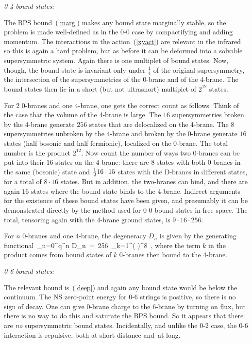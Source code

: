 {\it 0-4 bound states:} 

The BPS bound~(\ref{marg}) makes any bound state
marginally stable, so the problem is made well-defined as in the 0-0 case by
compactifying and adding momentum.\cite{senbound2}  The interactions in the
action~(\ref{xyact}) are relevant in the infrared so this is again a hard
problem, but as before it can be deformed into a solvable supersymmetric
system.  Again there is one multiplet of bound states.\cite{senbound2}
Now, though, the bound state is invariant only under $\frac{1}{4}$ of the
original supersymmetry, the intersection of the supersymmetries of the
0-brane and of the 4-brane.  The bound states then lie in a short (but not
ultrashort) multiplet of $2^{12}$ states.

For $2$ 0-branes and one 4-brane, one gets the correct count as
follows.\cite{vafa1} Think of the case that the volume of the 4-brane is
large.  The $16$ supersymmetries broken by the 4-brane generate $256$ states
that are  delocalized on the 4-brane.  The 8 supersymmetries unbroken by the
4-brane  and broken by the 0-brane generate $16$ states (half bosonic and
half fermionic), localized on the 0-brane. The total number is the product
$2^{12}$.  Now count the number of ways two 0-branes can be put into their
$16$ states on the 4-brane: there are $8$ states with both 0-branes in the
same (bosonic) state and ${\textstyle{1\over 2}} 16\cdot 15$ states with the D-branes in
different states, for a total of $8\cdot 16$ states.  But in addition, the
two-branes can bind, and there are again $16$ states where the bound state
binds to the 4-brane.  Indirect arguments for the existence of these bound
states have been given,\cite{vafa1} and presumably it
can be demonstrated directly by the
method used for 0-0 bound states in
free space.  The total,
tensoring again with the 4-brane ground states, is $9 \cdot 16 \cdot 256$.

For $n$ 0-branes and one 4-brane, the degeneracy $D_n$ is given by the
generating functional\,\cite{vafa1}
\be
\sum_{n=0}^\infty q^n D_n\ =\ 256\ \prod_{k=1}^\infty \left( \right)^8\ ,  \label{degen}
\ee
where the term $k$ in the product comes from bound states of $k$ 0-branes
then bound to the 4-brane.

{\it 0-6 bound states:} 

The relevant bound is~(\ref{deep}) and again any
bound state would be below the continuum.  The NS zero-point energy for 0-6
strings is positive, so there is no sign of decay.  One can give 0-brane
charge to the 6-brane
by turning on flux, but there is no way to do this and saturate the
BPS bound.  So it appears that there are {\it no} supersymmetric bound
states.  Incidentally, and unlike the 0-2 case, the 0-6 interaction is
repulsive, both at short distance and\,\cite{horpriv} at long.

